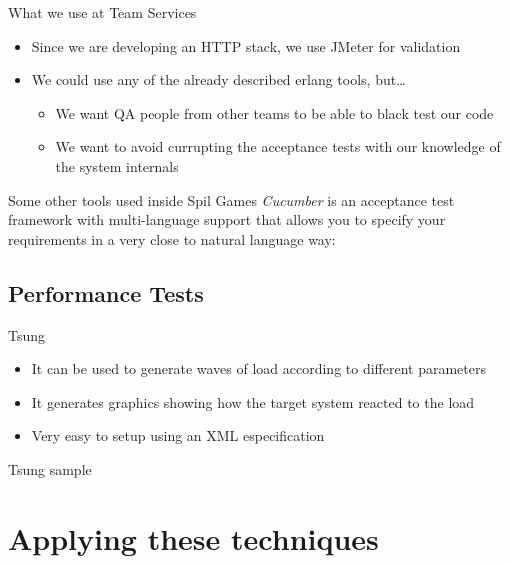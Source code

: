 \documentclass[pdf]{beamer}
\begin{document}
\begin{frame}{What we use at Team Services}
    \begin{itemize}
    \item Since we are developing an HTTP stack, we use JMeter for validation
    \item We could use any of the already described erlang tools, but\dots
    \pause
        \begin{itemize}
        \item We want QA people from other teams to be able to black test our code
        \item We want to avoid currupting the acceptance tests with our knowledge of the system internals
        \end{itemize}
    \end{itemize}
\end{frame}

\begin{frame}{Some other tools used inside Spil Games}
    \emph{Cucumber} is an acceptance test framework with multi-language support that allows you to specify your
    requirements in a very close to natural language way:
\end{frame}

\subsection*{Performance Tests}
\label{performance_tests}

\begin{frame}{Tsung}
    \begin{itemize}
    \item It can be used to generate waves of load according to different parameters
    \item It generates graphics showing how the target system reacted to the load
    \item Very easy to setup using an XML especification
    \end{itemize}
\end{frame}

\begin{frame}{Tsung sample}
\end{frame}

\section*{Applying these techniques}
\label{applying_these_techniques}
\end{document}

